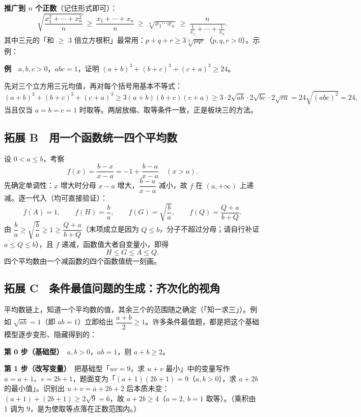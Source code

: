 \textbf{推广到 $n$ 个正数}（记住形式即可）：
\[
\sqrt{\frac{x_1^2+\cdots+x_n^2}{n}}\ \ge\ \frac{x_1+\cdots+x_n}{n}\ \ge\ \sqrt[n]{x_1\cdots x_n}\ \ge\ \frac{n}{\frac1{x_1}+\cdots+\frac1{x_n}}.
\]
其中三元的「和 $\ge$ 3 倍立方根积」最常用：$p+q+r\ge 3\sqrt[3]{pqr}$（$p,q,r>0$）。示例：

\textbf{例}　$a,b,c>0$，$abc=1$，证明 $(a+b)^3+(b+c)^3+(c+a)^3\ge 24$。

先对三个立方用三元均值，再对每个括号用基本不等式：
\[
(a+b)^3+(b+c)^3+(c+a)^3\ge 3(a+b)(b+c)(c+a)\ge 3\cdot 2\sqrt{ab}\cdot 2\sqrt{bc}\cdot 2\sqrt{ca}=24\sqrt{(abc)^2}=24,
\]
当且仅当 $a=b=c=1$ 时取等。两层放缩、取等条件一致，正是板块三的方法。

\newpage
\subsection*{拓展 B　用一个函数统一四个平均数 \starred\starred}

设 $0<a\le b$，考察
\[
f(x)=\frac{b-x}{x-a}=-1+\frac{b-a}{x-a}\quad(x>a).
\]
先确定单调性：$x$ 增大时分母 $x-a$ 增大，$\dfrac{b-a}{x-a}$ 减小，故 $f$ 在 $(a,+\infty)$ 上递减。逐一代入（均可直接验证）：
\[
f(A)=1,\qquad f(H)=\frac ba,\qquad f(G)=\sqrt{\frac ba},\qquad f(Q)=\frac{Q+a}{b+Q}.
\]
由 $\dfrac ba\ge\sqrt{\dfrac ba}\ge 1\ge\dfrac{Q+a}{b+Q}$（末项成立是因为 $Q\le b$，分子不超过分母；请自行补证 $a\le Q\le b$），且 $f$ 递减，函数值大者自变量小，即得
\[
H\le G\le A\le Q.
\]
四个平均数由一个减函数的四个函数值统一刻画。

\newpage
\subsection*{拓展 C　条件最值问题的生成：齐次化的视角}

平均数链上，知道一个平均数的值，其余三个的范围随之确定（「知一求三」）。例如 $\sqrt{ab}=1$（即 $ab=1$）立即给出 $\dfrac{a+b}{2}\ge 1$。许多条件最值题，都是把这个基础模型逐步变形、隐藏得到的：

\textbf{第 0 步（基础型）}　$a,b>0$，$ab=1$，则 $a+b\ge 2$。

\textbf{第 1 步（改写变量）}　把基础型「$uv=9$，求 $u+v$ 最小」中的变量写作 $u=a+1$、$v=2b+1$，题面变为「$(a+1)(2b+1)=9$（$a,b>0$），求 $a+2b$ 的最小值」。识别出 $u+v=a+2b+2$ 后本质未变：$(a+1)+(2b+1)\ge 2\sqrt9=6$，故 $a+2b\ge 4$（$a=2,\ b=1$ 取等）。（乘积由 1 调为 9，是为使取等点落在正数范围内。）

